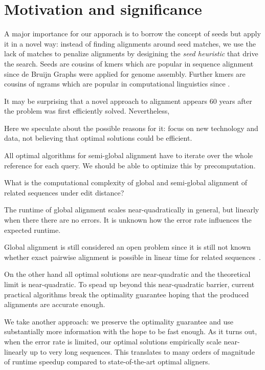\section*{Motivation and significance}

A major importance for our apporach is to borrow the concept of seeds but apply
it in a novel way: instead of finding alignments around seed matches, we use the
lack of matches to penalize alignments by desigining the \emph{seed heuristic}
that drive the \A search. Seeds are cousins of kmers which are popular in
sequence alignment since de Bruijn Graphs were applied for genome assembly.
Further kmers are cousins of ngrams which are popular in computational
linguistics since .

It may be surprising that a novel approach to alignment appears 60 years after
the problem was first efficiently solved. Nevertheless, 

Here we speculate about the possible
reasons for it: focus on new technology and data, not believing that optimal
solutions could be efficient.


All optimal algorithms for semi-global alignment have to iterate over the whole
reference for each query. We should be able to optimize this by precomputation.

\begin{problem}
    What is the computational complexity of global and semi-global alignment of
    related sequences under edit distance?
\end{problem}

The runtime of global alignment scales near-quadratically in general, but
linearly when there there are no errors. It is unknown how the error rate
influences the expected runtime.

Global alignment is still considered an open problem since it is still not known
whether exact pairwise alignment is possible in linear time for related
sequences~\citep{medvedev2022theoretical}. 

On the other hand all optimal solutions are near-quadratic and the theoretical
limit is near-quadratic. To spead up beyond this near-quadratic barrier, current
practical algorithms break the optimality guarantee hoping that the produced
alignments are accurate enough. 

We take another approach: we preserve the optimality guarantee and use
substantially more information with the hope to be fast enough. As it turns out,
when the error rate is limited, our optimal solutions empirically scale
near-linearly up to very long sequences. This translates to many orders of
magnitude of runtime speedup compared to state-of-the-art optimal aligners.

